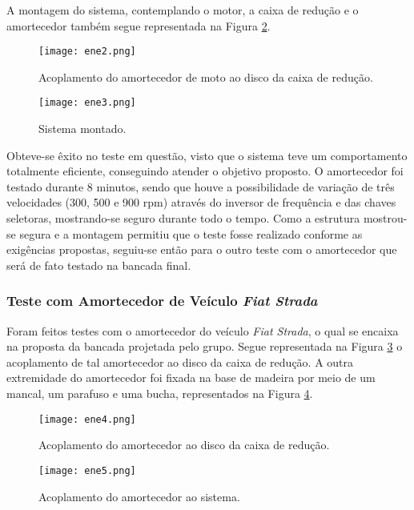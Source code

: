 	A montagem do sistema, contemplando o motor, a caixa de redução e o amortecedor também segue representada na Figura \ref{ene3}.

	\begin{figure}[!hbtp]
		\centering
		\texttt{[image: ene2.png]}
		\caption{Acoplamento do amortecedor de moto ao disco da caixa de redução.} 
		\label{ene2}
	\end{figure}

	\begin{figure}[!hbtp]
		\centering
		\texttt{[image: ene3.png]}
		\caption{Sistema montado.} 
		\label{ene3}
	\end{figure}

	Obteve-se êxito no teste em questão, visto que o sistema teve um comportamento totalmente eficiente, conseguindo atender o objetivo proposto. O amortecedor foi testado durante 8 minutos, sendo que houve a possibilidade de variação de três velocidades (300, 500 e 900 rpm) através do inversor de frequência e das chaves seletoras, mostrando-se seguro durante todo o tempo. Como a estrutura mostrou-se segura e a montagem permitiu que o teste fosse realizado conforme as exigências propostas, seguiu-se então para o outro teste com o amortecedor que será de fato testado na bancada final.

\subsubsection{Teste com Amortecedor de Veículo \textit{Fiat Strada}}
	
	Foram feitos testes com o amortecedor do veículo \textit{Fiat Strada}, o qual se encaixa na proposta da bancada projetada pelo grupo. Segue representada na Figura \ref{ene4} o acoplamento de tal amortecedor ao disco da caixa de redução. A outra extremidade do amortecedor foi fixada na base de madeira por meio de um mancal, um parafuso e uma bucha, representados na Figura \ref{ene5}.

	\begin{figure}[!hbtp]
		\centering
		\texttt{[image: ene4.png]}
		\caption{Acoplamento do amortecedor ao disco da caixa de redução.} 
		\label{ene4}
	\end{figure}

	\begin{figure}[!hbtp]
		\centering
		\texttt{[image: ene5.png]}
		\caption{Acoplamento do amortecedor ao sistema.} 
		\label{ene5}
	\end{figure}

